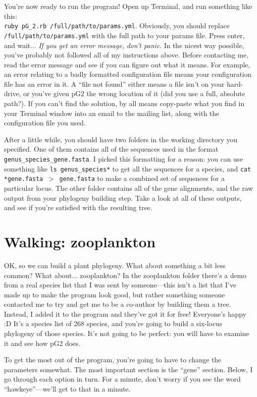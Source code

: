 \documentclass[12pt]{article}
\begin{document}
You're now ready to run the program! Open up Terminal, and run
something like this: \\\texttt{ruby pG\_2.rb
  /full/path/to/params.yml}. Obviously, you should replace
\texttt{/full/path/to/params.yml} with the full path to your params
file. Press enter, and wait... \emph{If you get an error message,
  don't panic}. In the nicest way possible, you've probably not
followed all of my instructions above. Before contacting me, read the
error message and see if you can figure out what it means. For
example, an error relating to a badly formatted configuration file
means your configuration file has an error in it. A ``file not found''
either means a file isn't on your hard-drive, or you've given pG2 the
wrong location of it (did you use a full, absolute path?). If you
can't find the solution, by all means copy-paste what you find in your
Terminal window into an email to the mailing list, along with the
configuration file you used.

After a little while, you should have two folders in the working
directory you specified. One of them contains all of the sequences
used in the format \texttt{genus\_species\_gene.fasta}. I picked this
formatting for a reason: you can use something like \texttt{ls
  genus\_species*} to get all the sequences for a species, and
\texttt{cat *gene.fasta $>$ gene.fasta} to make a combined set of
sequences for a particular locus. The other folder contains all of the
gene alignments, and the raw output from your phylogeny building
step. Take a look at all of these outputs, and see if you're satisfied
with the resulting tree.

\section*{Walking: zooplankton}
OK, so we can build a plant phylogeny. What about something a bit less
common? What about... zooplankton? In the zooplankton folder there's a
demo from a real species list that I was sent by someone---this isn't
a list that I've made up to make the program look good, but rather
something someone contacted me to try and get me to be a co-author by
building them a tree. Instead, I added it to the program and they've
got it for free! Everyone's happy :D It's a species list of 268
species, and you're going to build a six-locus phylogeny of those
species. It's not going to be perfect: you will have to examine it and
see how pG2 does.

To get the most out of the program, you're going to have to change the
parameters somewhat. The most important section is the ``gene''
section. Below, I go through each option in turn. For a minute, don't
worry if you see the word ``hawkeye''---we'll get to that in a minute.
\end{document}
